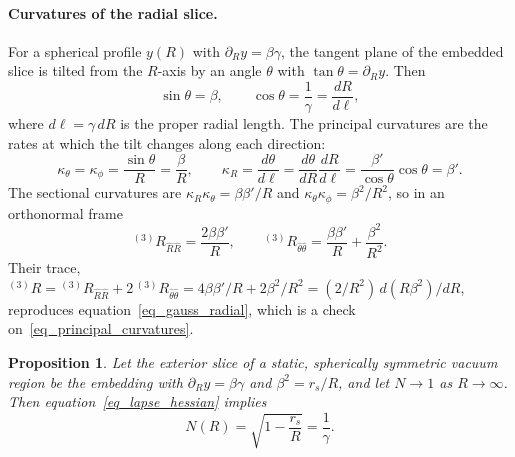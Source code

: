 \documentclass[pdflatex,sn-mathphys-num]{sn-jnl}%
\theoremstyle{thmstyleone}%
\newtheorem{proposition}[theorem]{Proposition}%
\theoremstyle{thmstyletwo}%
\theoremstyle{thmstylethree}%
\begin{document}
\paragraph{Curvatures of the radial slice.}
For a spherical profile $y(R)$ with $\partial_Ry=\beta\gamma$, the tangent plane of the embedded slice is tilted from the $R$-axis by an angle $\theta$ with $\tan\theta=\partial_Ry$. Then
\begin{equation}
    \sin\theta=\beta,\qquad \cos\theta=\frac{1}{\gamma}=\frac{dR}{d\ell},
\end{equation}
where $d\ell=\gamma\,dR$ is the proper radial length. The principal curvatures are the rates at which the tilt changes along each direction:
\begin{equation}\label{eq_principal_curvatures}
    \kappa_\theta=\kappa_\phi=\frac{\sin\theta}{R}=\frac{\beta}{R},
    \qquad
    \kappa_R=\frac{d\theta}{d\ell}=\frac{d\theta}{dR}\frac{dR}{d\ell}=\frac{\beta'}{\cos\theta}\cos\theta=\beta' .
\end{equation}
The sectional curvatures are $\kappa_R\kappa_\theta=\beta\beta'/R$ and $\kappa_\theta\kappa_\phi=\beta^2/R^2$, so in an orthonormal frame
\begin{equation}
    {}^{(3)}\!R_{\hat R\hat R}=\frac{2\beta\beta'}{R},
    \qquad
    {}^{(3)}\!R_{\hat\theta\hat\theta}=\frac{\beta\beta'}{R}+\frac{\beta^2}{R^2}.
\end{equation}
Their trace, ${}^{(3)}\!R={}^{(3)}\!R_{\hat R\hat R}+2\,{}^{(3)}\!R_{\hat\theta\hat\theta}=4\beta\beta'/R+2\beta^2/R^2=(2/R^2)\,d(R\beta^2)/dR$, reproduces equation~\eqref{eq_gauss_radial}, which is a check on~\eqref{eq_principal_curvatures}.

\begin{proposition}\label{prop_lapse}
Let the exterior slice of a static, spherically symmetric vacuum region be the embedding with $\partial_Ry=\beta\gamma$ and $\beta^2=r_s/R$, and let $N\to1$ as $R\to\infty$. Then equation~\eqref{eq_lapse_hessian} implies
\begin{equation}
    N(R)=\sqrt{1-\frac{r_s}{R}}=\frac{1}{\gamma}.
\end{equation}
\end{proposition}
\end{document}
